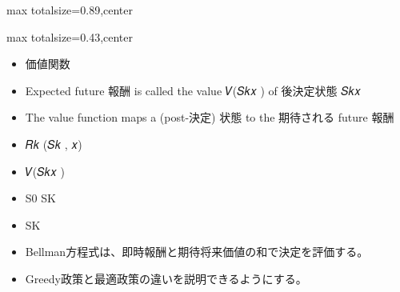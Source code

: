 \begin{minipage}[t]{0.58\textwidth}
\begin{adjustbox}{max totalsize={\textwidth}{0.89\textheight},center}
\begin{minipage}{\textwidth}
\end{minipage}
\end{adjustbox}
\end{minipage}


\clearpage
{}
\begin{minipage}[t]{0.405\textwidth}
\begin{adjustbox}{max totalsize={\textwidth}{0.43\textheight},center}
\begin{minipage}{\textwidth}\scriptsize
{}\begin{itemize}
\item 価値関数
\item Expected future 報酬 is called the value 𝑉(𝑆𝑘𝑥 ) of 後決定状態 𝑆𝑘𝑥
\item The value function maps a (post-決定) 状態 to the 期待される future 報酬
\item 𝑅𝑘 (𝑆𝑘 , 𝑥)
\item 𝑉(𝑆𝑘𝑥 )
\item S0 SK
\item SK
\end{itemize}\begin{itemize}
\item Bellman方程式は、即時報酬と期待将来価値の和で決定を評価する。
\item Greedy政策と最適政策の違いを説明できるようにする。
\end{itemize}
\end{minipage}
\end{adjustbox}
\end{minipage}\hfill
